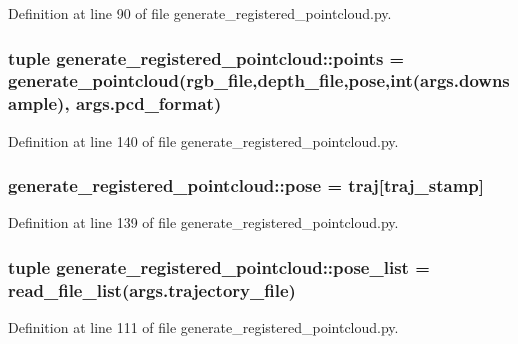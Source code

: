 \-Definition at line 90 of file generate\-\_\-registered\-\_\-pointcloud.\-py.

\subsubsection[{points}]{\setlength{\rightskip}{0pt plus 5cm}tuple {\bf generate\-\_\-registered\-\_\-pointcloud\-::points} = {\bf generate\-\_\-pointcloud}({\bf rgb\-\_\-file},{\bf depth\-\_\-file},{\bf pose},int(args.\-downsample), args.\-pcd\-\_\-format)}\label{namespacegenerate__registered__pointcloud_a24c8351968d03ac8c504516e080242e1}


\-Definition at line 140 of file generate\-\_\-registered\-\_\-pointcloud.\-py.

\subsubsection[{pose}]{ {\bf generate\-\_\-registered\-\_\-pointcloud\-::pose} = {\bf traj}[traj\-\_\-stamp]}\label{namespacegenerate__registered__pointcloud_a3daffb7e2bf8370a3bda3e394b46584a}


\-Definition at line 139 of file generate\-\_\-registered\-\_\-pointcloud.\-py.

\subsubsection[{pose\-\_\-list}]{\setlength{\rightskip}{0pt plus 5cm}tuple {\bf generate\-\_\-registered\-\_\-pointcloud\-::pose\-\_\-list} = read\-\_\-file\-\_\-list(args.\-trajectory\-\_\-file)}\label{namespacegenerate__registered__pointcloud_a09d3c32099083e670950f3ac5e25b6c6}


\-Definition at line 111 of file generate\-\_\-registered\-\_\-pointcloud.\-py.

